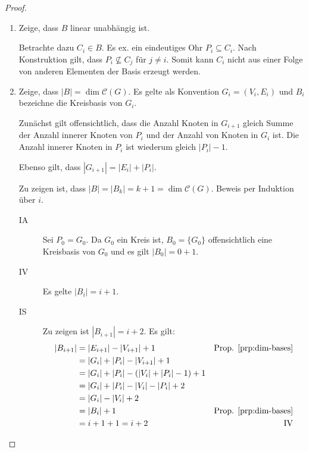\begin{proof}
    \begin{enumerate}
        \item Zeige, dass $ B $ linear unabhängig ist.

        Betrachte dazu $ C_i \in B $.
        Es ex. ein eindeutiges Ohr $ P_i \subseteq C_i $.
        Nach Konstruktion gilt, dass $ P_i \not \subseteq C_j $ für $ j \ne i $.
        Somit kann $ C_i $ nicht aus einer Folge von anderen Elementen der Basis erzeugt werden.

        \item Zeige, dass $ |B| = \dim \mathcal{C}(G) $.
        Es gelte als Konvention $ G_i = (V_i, E_i) $ und $ B_i $ bezeichne die Kreisbasis von $ G_i $.

        Zunächst gilt offensichtlich, dass die Anzahl Knoten in $ G_{i + 1} $ gleich Summe der Anzahl innerer Knoten von $ P_i $ und der Anzahl von Knoten in $ G_i $ ist.
        Die Anzahl innerer Knoten in $ P_i $ ist wiederum gleich $ |P_i| - 1 $.

        Ebenso gilt, dass $ |G_{i + 1}| = |E_{i}| + |P_{i}| $.

        Zu zeigen ist, dass $ |B| = |B_k| = k + 1 = \dim \mathcal{C}(G) $.
        Beweis per Induktion über $ i $.
        \begin{description}
            \item[IA] Sei $ P_0 = G_0 $.
            Da $ G_0 $ ein Kreis ist, $ B_0 = \{ G_0 \} $ offensichtlich eine Kreisbasis von $ G_0 $ und es gilt $ |B_0| = 0 + 1 $.
            \item[IV] Es gelte $ |B_i| = i + 1 $.
            \item[IS] Zu zeigen ist $ |B_{i + 1}| = i + 2 $.
            Es gilt:
            \begin{align*}
                |B_{i + 1}| &= |E_{i + 1}| - |V_{i + 1}| + 1 & \text{Prop. \ref{prp:dim-bases}} \\
                &= |G_i| + |P_i| - |V_{i + 1}| + 1 \\
                &= |G_i| + |P_i| - (|V_i| + |P_i| - 1) + 1 \\
                &= |G_i| + |P_i| - |V_i| - |P_i| + 2 \\
                &= |G_i| - |V_i| + 2 \\
                &= |B_i| + 1 & \text{Prop. \ref{prp:dim-bases}} \\
                &= i + 1 + 1 = i + 2 & \text{IV}
            \end{align*}
        \end{description}
    \end{enumerate}
\end{proof}

